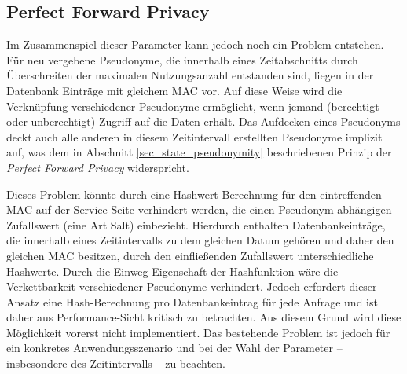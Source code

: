 \subsection{Perfect Forward Privacy}

Im Zusammenspiel dieser Parameter kann jedoch noch ein Problem entstehen. Für neu vergebene Pseudonyme, die innerhalb eines Zeitabschnitts durch Überschreiten der maximalen Nutzungsanzahl entstanden sind, liegen in der Datenbank Einträge mit gleichem MAC vor. Auf diese Weise wird die Verknüpfung verschiedener Pseudonyme ermöglicht, wenn jemand (berechtigt oder unberechtigt) Zugriff auf die Daten erhält. Das Aufdecken eines Pseudonyms deckt auch alle anderen in diesem Zeitintervall erstellten Pseudonyme implizit auf, was dem in Abschnitt \ref{sec_state_pseudonymity} beschriebenen Prinzip der \textit{Perfect Forward Privacy} widerspricht. 

Dieses Problem könnte durch eine Hashwert-Berechnung für den eintreffenden MAC auf der Service-Seite verhindert werden, die einen Pseudonym-abhängigen Zufallswert (eine Art Salt) einbezieht. Hierdurch enthalten Datenbankeinträge, die innerhalb eines Zeitintervalls zu dem gleichen Datum gehören und daher den gleichen MAC besitzen, durch den einfließenden Zufallswert unterschiedliche Hashwerte. Durch die Einweg-Eigenschaft der Hashfunktion wäre die Verkettbarkeit verschiedener Pseudonyme verhindert. 
Jedoch erfordert dieser Ansatz eine Hash-Berechnung pro Datenbankeintrag für jede Anfrage und ist daher aus Performance-Sicht kritisch zu betrachten. Aus diesem Grund wird diese Möglichkeit vorerst nicht implementiert. Das bestehende Problem ist jedoch für ein konkretes Anwendungsszenario und bei der Wahl der Parameter -- insbesondere des Zeitintervalls -- zu beachten.
